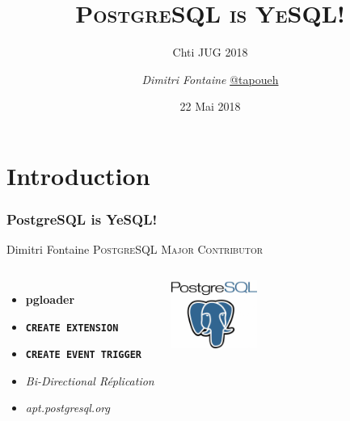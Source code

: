 \documentclass{beamer}
\title{\textsc{PostgreSQL is YeSQL!}}
\subtitle{Chti JUG 2018}
\author{\textit{Dimitri Fontaine} \url{@tapoueh}}
\institute{CitusData}
\date{22 Mai 2018}
\begin{document}
\frame{\titlepage}

\section{Introduction}

\begin{frame}[fragile]
  \frametitle{PostgreSQL is YeSQL!}

  \begin{center}
    {\Huge Dimitri Fontaine}
    \vfill
    {\Large \textsc{PostgreSQL Major Contributor}}
  \end{center}

\begin{columns}[c]

  \begin{itemize}
   \item \textbf{pgloader}
   \item \texttt{\textbf{CREATE EXTENSION}}
   \item \texttt{\textbf{CREATE EVENT TRIGGER}}
   \item \textit{Bi-Directional Réplication}
   \item \textit{apt.postgresql.org}
  \end{itemize}  

\begin{center}
  \includegraphics[height=6em]{postgres-logo.png}
\end{center}
\end{columns}
\end{frame}
\end{document}
